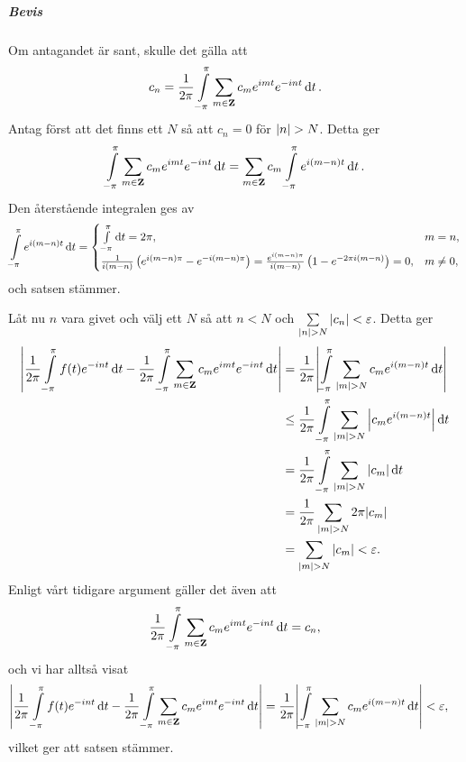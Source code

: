 \subparagraph{Bevis}
Om antagandet är sant, skulle det gälla att
\begin{align*}
	c_{n} = \frac{1}{2\pi}\int\limits_{-\pi}^{\pi}\sum\limits_{m\in\mathbf{Z}}c_{m}e^{imt}e^{-int}\dd{t}.
\end{align*}
Antag först att det finns ett $N$ så att $c_{n} = 0$ för $\abs{n} > N$. Detta ger
\begin{align*}
	\int\limits_{-\pi}^{\pi}\sum\limits_{m\in\mathbf{Z}}c_{m}e^{imt}e^{-int}\dd{t} = \sum\limits_{m\in\mathbf{Z}}c_{m}\int\limits_{-\pi}^{\pi}e^{i(m - n)t}\dd{t}.
\end{align*}
Den återstående integralen ges av
\begin{align*}
	\int\limits_{-\pi}^{\pi}e^{i(m - n)t}\dd{t} =
	\begin{cases}
		\int\limits_{-\pi}^{\pi}\dd{t} = 2\pi,                                       &m = n, \\
		\frac{1}{i(m - n)}\left(e^{i(m - n)\pi} - e^{-i(m - n)\pi}\right) = \frac{e^{i(m - n)\pi}}{i(m - n)}\left(1 - e^{-2\pi i(m - n)}\right) = 0, &m\neq 0,
	\end{cases}
\end{align*}
och satsen stämmer.

Låt nu $n$ vara givet och välj ett $N$ så att $n < N$ och $\sum\limits_{\abs{n} > N}\abs{c_{n}} < \varepsilon$. Detta ger
\begin{align*}
	\abs{\frac{1}{2\pi}\int\limits_{-\pi}^{\pi}f(t)e^{-int}\dd{t} - \frac{1}{2\pi}\int\limits_{-\pi}^{\pi}\sum\limits_{m\in\mathbf{Z}}c_{m}e^{imt}e^{-int}\dd{t}} &= \frac{1}{2\pi}\abs{\int\limits_{-\pi}^{\pi}\sum\limits_{\abs{m} > N}c_{m}e^{i(m - n)t}\dd{t}} \\
	                                      &\leq \frac{1}{2\pi}\int\limits_{-\pi}^{\pi}\sum\limits_{\abs{m} > N}\abs{c_{m}e^{i(m - n)t}}\dd{t} \\
	                                      &= \frac{1}{2\pi}\int\limits_{-\pi}^{\pi}\sum\limits_{\abs{m} > N}\abs{c_{m}}\dd{t} \\
	                                      &= \frac{1}{2\pi}\sum\limits_{\abs{m} > N}2\pi\abs{c_{m}} \\
	                                      &= \sum\limits_{\abs{m} > N}\abs{c_{m}} < \varepsilon.
\end{align*}
Enligt vårt tidigare argument gäller det även att
\begin{align*}
	\frac{1}{2\pi}\int\limits_{-\pi}^{\pi}\sum\limits_{m\in\mathbf{Z}}c_{m}e^{imt}e^{-int}\dd{t} = c_{n},
\end{align*}
och vi har alltså visat
\begin{align*}
	\abs{\frac{1}{2\pi}\int\limits_{-\pi}^{\pi}f(t)e^{-int}\dd{t} - \frac{1}{2\pi}\int\limits_{-\pi}^{\pi}\sum\limits_{m\in\mathbf{Z}}c_{m}e^{imt}e^{-int}\dd{t}} &= \frac{1}{2\pi}\abs{\int\limits_{-\pi}^{\pi}\sum\limits_{\abs{m} > N}c_{m}e^{i(m - n)t}\dd{t}} < \varepsilon,
\end{align*}
vilket ger att satsen stämmer.

